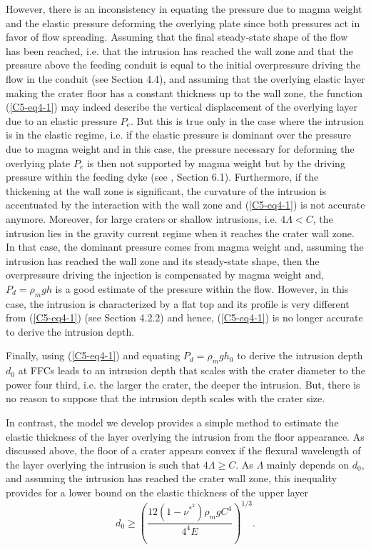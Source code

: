 However, there  is an  inconsistency in equating  the pressure  due to
magma weight  and the elastic  pressure deforming the  overlying plate
since both pressures act in favor of flow spreading. Assuming that the
final steady-state shape  of the flow has been reached,  i.e. that the
intrusion has  reached the wall zone  and that the pressure  above the
feeding conduit is equal to  the initial overpressure driving the flow
in  the conduit  (see Section  4.4), and  assuming that  the overlying
elastic layer making  the crater floor has a constant  thickness up to
the wall zone,  the function (\ref{C5-eq4-1}) may  indeed describe the
vertical  displacement  of  the  overlying layer  due  to  an  elastic
pressure  $P_{e}$.  But  this  is  true only  in  the  case where  the
intrusion is  in the elastic regime,  i.e. if the elastic  pressure is
dominant over the  pressure due to magma weight and  in this case, the
pressure necessary for  deforming the overlying plate  $P_{e}$ is then
not supported by  magma weight but by the driving  pressure within the
feeding dyke (see  \citep{Michaut:2011kg}, Section 6.1).  Furthermore,
if the  thickening at the wall  zone is significant, the  curvature of
the intrusion is accentuated by the interaction with the wall zone and
(\ref{C5-eq4-1}) is not accurate anymore.  Moreover, for large craters
or shallow intrusions, i.e.  $4\Lambda  <C$, the intrusion lies in the
gravity current regime  when it reaches the crater wall  zone. In that
case, the dominant pressure comes  from magma weight and, assuming the
intrusion has reached  the wall zone and its  steady-state shape, then
the overpressure driving the injection  is compensated by magma weight
and, $P_{d}=\rho_{m}gh$ is a good  estimate of the pressure within the
flow. However, in this case, the  intrusion is characterized by a flat
top  and its  profile  is very  different  from (\ref{C5-eq4-1})  (see
Section   4.2.2)   \citep{Bunger:2011cb,Michaut:2011kg}   and   hence,
(\ref{C5-eq4-1}) is no longer accurate to derive the intrusion depth.
		
Finally,  using (\ref{C5-eq4-1})  and equating  $P_d=\rho_m g  h_0$ to
derive the intrusion depth $d_0$ at FFCs leads to an intrusion depth
that scales with the crater diameter to the power four third, i.e. the
larger the crater, the deeper the  intrusion.  But, there is no reason
to suppose that the intrusion depth scales with the crater size.
		
In contrast, the model we develop provides a simple method to estimate
the elastic  thickness of the  layer overlying the intrusion  from the
floor appearance.  As  discussed above, the floor of  a crater appears
convex if the flexural wavelength of the layer overlying the intrusion
is  such that  $4  \Lambda \ge  C$.  As  $\Lambda$  mainly depends  on
$d_0$,  and assuming  the intrusion  has reached  the crater  wall
zone,  this inequality  provides  for  a lower  bound  on the  elastic
thickness of the upper layer
\begin{equation}
  d_0 \ge \left(\frac{12(1-\nu^*^{2})\rho_{m}gC^{4}}{4^4 E}\right)^{1/3}.
  \label{C5-eq5-2}
\end{equation}

